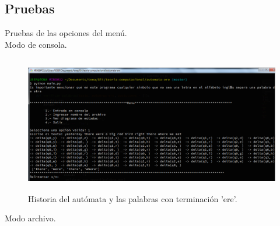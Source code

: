 	\subsection{Pruebas}
	Pruebas de las opciones del menú.
	\\
	{\large Modo de consola.}
	\begin{figure}[H]
		\begin{center}
			\includegraphics[width=\linewidth, height=6cm]{img/ere-manual.png}
			\caption{Historia del autómata y las palabras con terminación 'ere'.}
			\label{fig:ere1}
		\end{center}
	\end{figure}
	{\large Modo archivo.}
